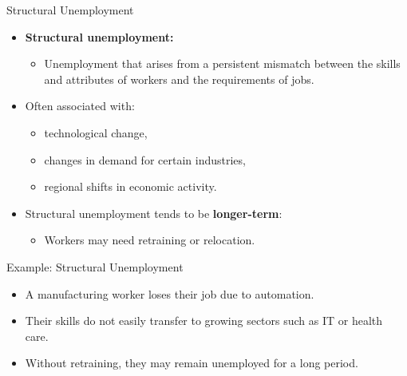 \documentclass[aspectratio=169]{beamer}
\begin{document}
\begin{frame}{Structural Unemployment}
\transfade
\begin{itemize}
  \item \textbf{Structural unemployment:}
  \begin{itemize}
    \item Unemployment that arises from a persistent \alert{mismatch} between the skills and attributes of workers and the requirements of jobs.
  \end{itemize}
  \item Often associated with:
  \begin{itemize}
    \item technological change,
    \item changes in demand for certain industries,
    \item regional shifts in economic activity.
  \end{itemize}
  \item Structural unemployment tends to be \textbf{longer-term}:
  \begin{itemize}
    \item Workers may need retraining or relocation.
  \end{itemize}
\end{itemize}
\end{frame}

\begin{frame}{Example: Structural Unemployment}
\transfade
\begin{itemize}
  \item A manufacturing worker loses their job due to automation.
  \item Their skills do not easily transfer to growing sectors such as IT or health care.
  \item Without retraining, they may remain unemployed for a long period.
\end{itemize}
\end{frame}
\end{document}

